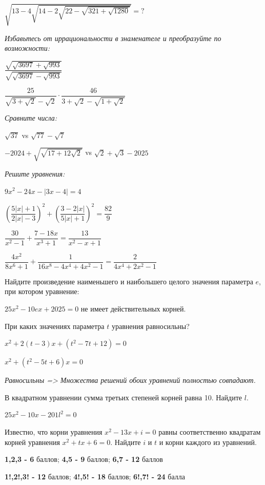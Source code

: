  $\sqrt{13-4\sqrt{14-2\sqrt{22-\sqrt{321+\sqrt{1280}}}}}=?$

\hspace{3mm}

\centerline{\textit{Избавьтесь от иррациональности в знаменателе и преобразуйте по возможности:}}

 $\dfrac{\sqrt{\sqrt{3697} + \sqrt{993}}}{\sqrt{\sqrt{3697} - \sqrt{993}}}$

 $\dfrac{25}{\sqrt{3 + \sqrt{2}}-\sqrt{2}} \cdot \dfrac{46}{3+\sqrt{2}-\sqrt{1 + \sqrt{2}}}$

 \newpage


\centerline{\textit{ Сравните числа:}}

 $\sqrt{37}$ vs $\sqrt{77}-\sqrt{7}$

 $-2024+\sqrt{\sqrt{17+12\sqrt{2}}}$ vs $\sqrt{2}+\sqrt{3}-2025$

 \hspace{3mm}

\centerline{\textit{ Решите уравнения:}}

 $9x^2-24x-|3x-4|=4$

  $\left(\dfrac{5|x|+1}{2|x|-3}\right)^2 + \left(\dfrac{3-2|x|}{5|x|+1}\right)^2 = \dfrac{82}{9}$

 \hspace{3mm}


 $\dfrac{30}{x^2-1} + \dfrac{7-18x}{x^3+1}=\dfrac{13}{x^2-x+1}$

 $\dfrac{4x^2}{8x^6+1} + \dfrac{1}{16x^8-4x^4+4x^2-1}=\dfrac{2}{4x^4+2x^2-1}$

 \hspace{3mm}

  Найдите произведение наименьшего и наибольшего целого значения параметра $e$, при котором уравнение:
 
 $25x^2-10ex+2025=0$ не имеет действительных корней.
 
  При каких значениях параметра $t$ уравнения равносильны? 

$x^2+2(t-3)x+(t^2-7t+12)=0$ 

$x^2+(t^2-5t+6)x=0$

\textit{Равносильны => Множества решений обоих уравнений полностью совпадают.}

  В квадратном уравнении сумма третьих степеней корней равна 10. Найдите $l$.

 $25x^2-10x-201l^2=0$

  Известно, что корни уравнения $x^2-13x+i=0$ равны соответственно квадратам корней уравнения $x^2+tx+6=0$. Найдите $i$ и $t$ и корни каждого из уравнений.

  \hspace{3mm}

\centerline{\textbf{1,2,3 - 6} баллов; \textbf{4,5 - 9} баллов; \textbf{6,7 - 12} баллов}

\centerline{\textbf{1!,2!,3! - 12} баллов; \textbf{4!,5! - 18} баллов; \textbf{6!,7! - 24} балла}



 